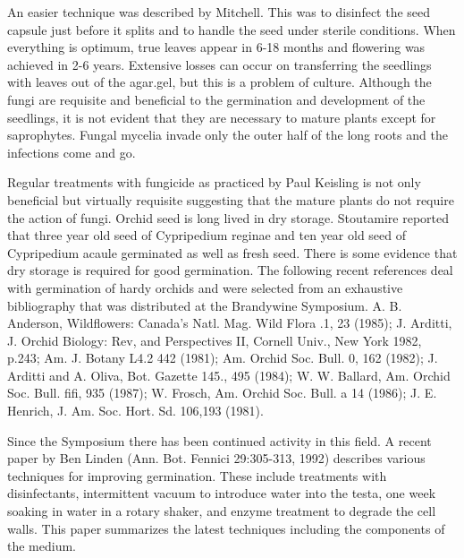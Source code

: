 An easier technique was described by Mitchell. This was to disinfect the seed capsule
just before it splits and to handle the seed under sterile conditions.
When everything is optimum, true leaves appear in 6-18 months and flowering
was achieved in 2-6 years. Extensive losses can occur on transferring the seedlings
with leaves out of the agar.gel, but this is a problem of culture. Although the fungi are
requisite and beneficial to the germination and development of the seedlings, it is not
evident that they are necessary to mature plants except for saprophytes. Fungal
mycelia invade only the outer half of the long roots and the infections come and go.

Regular treatments with fungicide as practiced by Paul Keisling is not only beneficial
but virtually requisite suggesting that the mature plants do not require the action of
fungi. Orchid seed is long lived in dry storage. Stoutamire reported that three year old
seed of Cypripedium reginae and ten year old seed of Cypripedium acaule
germinated as well as fresh seed. There is some evidence that dry storage is required
for good germination. The following recent references deal with germination of hardy
orchids and were selected from an exhaustive bibliography that was distributed at the
Brandywine Symposium. A. B. Anderson, Wildflowers: Canada's Natl. Mag. Wild Flora
.1, 23 (1985); J. Arditti, J. Orchid Biology: Rev, and Perspectives II, Cornell Univ., New
York 1982, p.243; Am. J. Botany L4.2 442 (1981); Am. Orchid Soc. Bull. 0, 162
(1982); J. Arditti and A. Oliva, Bot. Gazette 145., 495 (1984); W. W. Ballard, Am. Orchid
Soc. Bull. fifi, 935 (1987); W. Frosch, Am. Orchid Soc. Bull. a 14 (1986); J. E.
Henrich, J. Am. Soc. Hort. Sd. 106,193 (1981).

Since the Symposium there has been continued activity in this field. A recent
paper by Ben Linden (Ann. Bot. Fennici 29:305-313, 1992) describes various
techniques for improving germination. These include treatments with disinfectants,
intermittent vacuum to introduce water into the testa, one week soaking in water in a
rotary shaker, and enzyme treatment to degrade the cell walls. This paper
summarizes the latest techniques including the components of the medium.

